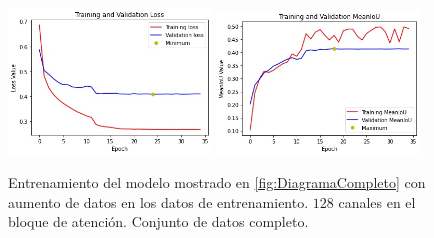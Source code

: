 \begin{figure}[h!]
  \centering
  \includegraphics[width=0.48\textwidth]{../../modelos-entrenados/unet-nonlocal/ejecucion8/loss}
  \includegraphics[width=0.48\textwidth]{../../modelos-entrenados/unet-nonlocal/ejecucion8/iou}
  \caption{Entrenamiento del modelo mostrado en \autoref{fig:DiagramaCompleto} con aumento de datos en los datos de entrenamiento. $128$ canales en el bloque de atención. Conjunto de datos completo.}
  \label{fig:ejec8}
\end{figure}

